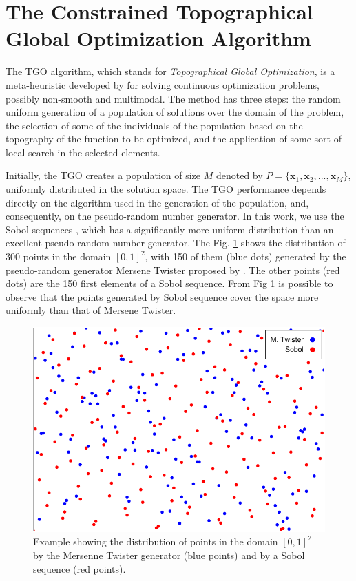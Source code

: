 \section{The Constrained Topographical Global Optimization Algorithm}\label{sec:Methods}

The TGO algorithm, which stands for \textit{Topographical Global Optimization}, is a meta-heuristic developed by \cite{ITGO1} for solving continuous optimization problems, possibly non-smooth and multimodal. The method has three steps: the random uniform generation of a population of solutions over the domain of the problem, the selection of some of the individuals of the population based on the topography of the function to be optimized, and the application of some sort of local search in the selected elements.


Initially, the TGO creates a population of size $M$ denoted by $P = \{\bm{x}_1, \bm{x}_2, ..., \allowbreak \bm{x}_M\}$, uniformly distributed in the solution space. The TGO performance depends directly on the algorithm used in the generation of the population, and, consequently, on the pseudo-random number generator. In this work, we use the Sobol sequences \cite{Sobol, ITGO3}, which has a significantly more uniform distribution than an excellent pseudo-random number generator. The Fig. \ref{fig:Sobol} shows the distribution of 300 points in the domain $[0, 1]^2$, with 150 of them (blue dots) generated by the pseudo-random generator Mersene Twister proposed by \cite{mt19937}. The other points (red dots) are the 150 first elements of a Sobol sequence. From Fig \ref{fig:Sobol} is possible to observe that the points generated by Sobol sequence cover the space more uniformly than that of Mersene Twister.


\begin{figure}[h]
\begin{center}
\includegraphics[scale=0.8]{scatter-crop.pdf}
\end{center}
\captionsetup{justification=centering}
\caption{Example showing the distribution of points in the domain $[0, 1]^2$ by the Mersenne Twister generator (blue points) and by a Sobol sequence (red points). }\label{fig:Sobol}
\end{figure}


